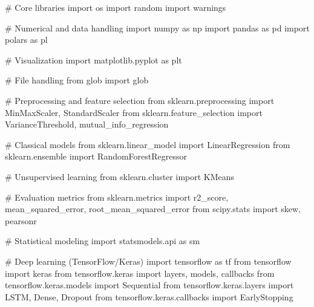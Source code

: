 \documentclass[
  letterpaper,
  DIV=11,
  numbers=noendperiod]{scrartcl}
\newenvironment{Shaded}{\begin{snugshade}}{\end{snugshade}}
\newcommand{\CommentTok}[1]{\textcolor[rgb]{0.37,0.37,0.37}{#1}}
\newcommand{\ImportTok}[1]{\textcolor[rgb]{0.00,0.46,0.62}{#1}}
\newcommand{\NormalTok}[1]{\textcolor[rgb]{0.00,0.23,0.31}{#1}}
\begin{document}
\begin{Shaded}
\begin{Highlighting}[]
\CommentTok{\# Core libraries}
\ImportTok{import}\NormalTok{ os                                   }
\ImportTok{import}\NormalTok{ random                              }
\ImportTok{import}\NormalTok{ warnings                           }

\CommentTok{\# Numerical and data handling}
\ImportTok{import}\NormalTok{ numpy }\ImportTok{as}\NormalTok{ np                         }
\ImportTok{import}\NormalTok{ pandas }\ImportTok{as}\NormalTok{ pd                     }
\ImportTok{import}\NormalTok{ polars }\ImportTok{as}\NormalTok{ pl                       }

\CommentTok{\# Visualization}
\ImportTok{import}\NormalTok{ matplotlib.pyplot }\ImportTok{as}\NormalTok{ plt           }

\CommentTok{\# File handling}
\ImportTok{from}\NormalTok{ glob }\ImportTok{import}\NormalTok{ glob                     }

\CommentTok{\# Preprocessing and feature selection}
\ImportTok{from}\NormalTok{ sklearn.preprocessing }\ImportTok{import}\NormalTok{ MinMaxScaler, StandardScaler }
\ImportTok{from}\NormalTok{ sklearn.feature\_selection }\ImportTok{import}\NormalTok{ VarianceThreshold, mutual\_info\_regression  }

\CommentTok{\# Classical models}
\ImportTok{from}\NormalTok{ sklearn.linear\_model }\ImportTok{import}\NormalTok{ LinearRegression             }
\ImportTok{from}\NormalTok{ sklearn.ensemble }\ImportTok{import}\NormalTok{ RandomForestRegressor            }

\CommentTok{\# Unsupervised learning}
\ImportTok{from}\NormalTok{ sklearn.cluster }\ImportTok{import}\NormalTok{ KMeans                            }

\CommentTok{\# Evaluation metrics}
\ImportTok{from}\NormalTok{ sklearn.metrics }\ImportTok{import}\NormalTok{ r2\_score, mean\_squared\_error, root\_mean\_squared\_error  }
\ImportTok{from}\NormalTok{ scipy.stats }\ImportTok{import}\NormalTok{ skew, pearsonr                        }

\CommentTok{\# Statistical modeling}
\ImportTok{import}\NormalTok{ statsmodels.api }\ImportTok{as}\NormalTok{ sm                                  }

\CommentTok{\# Deep learning (TensorFlow/Keras)}
\ImportTok{import}\NormalTok{ tensorflow }\ImportTok{as}\NormalTok{ tf                                     }
\ImportTok{from}\NormalTok{ tensorflow }\ImportTok{import}\NormalTok{ keras                                 }
\ImportTok{from}\NormalTok{ tensorflow.keras }\ImportTok{import}\NormalTok{ layers, models, callbacks        }
\ImportTok{from}\NormalTok{ tensorflow.keras.models }\ImportTok{import}\NormalTok{ Sequential               }
\ImportTok{from}\NormalTok{ tensorflow.keras.layers }\ImportTok{import}\NormalTok{ LSTM, Dense, Dropout      }
\ImportTok{from}\NormalTok{ tensorflow.keras.callbacks }\ImportTok{import}\NormalTok{ EarlyStopping}
\end{Highlighting}
\end{Shaded}
\end{document}
